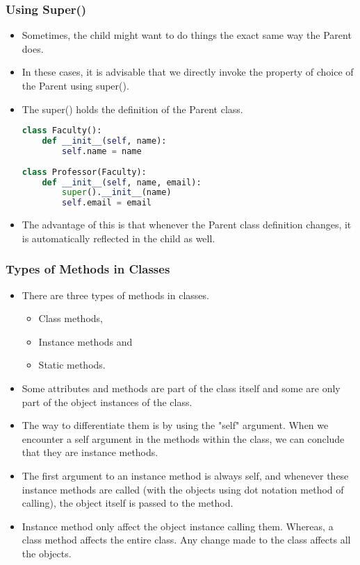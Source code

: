 \documentclass{beamer}
\begin{document}
\begin{frame}[fragile]
\frametitle{Using Super()}
\begin{itemize}
\item Sometimes, the child might want to do things the exact same way the Parent does. 
\item In these cases, it is advisable that we directly invoke the property of choice of the Parent using super().

\item The super() holds the definition of the Parent class.
\begin{lstlisting}[language=Python]
class Faculty():
    def __init__(self, name):
        self.name = name
    
class Professor(Faculty):
    def __init__(self, name, email):
        super().__init__(name)
        self.email = email        
\end{lstlisting}

\item The advantage of this is that whenever the Parent class definition changes, it is automatically reflected in the child as well.
\end{itemize}
\end{frame}

\begin{frame}[fragile]
\frametitle{Types of Methods in Classes}
\begin{itemize}
\item There are three types of methods in classes.
\begin{itemize}
\item Class methods,
\item Instance methods and 
\item Static methods.
\end{itemize}
\item Some attributes and methods are part of the class itself and some are only part of the object instances of the class.
\item The way to differentiate them is by using the "self" argument. When we encounter a self argument in the methods within the class, we can conclude that they are instance methods.
\item The first argument to an instance method is always self, and whenever these instance methods are called (with the objects using dot notation method of calling), the object itself is passed to the method.
\item Instance method only affect the object instance calling them. Whereas, a class method affects the entire class. Any change made to the class affects all the objects.
\end{itemize}
\end{frame}
\end{document}
